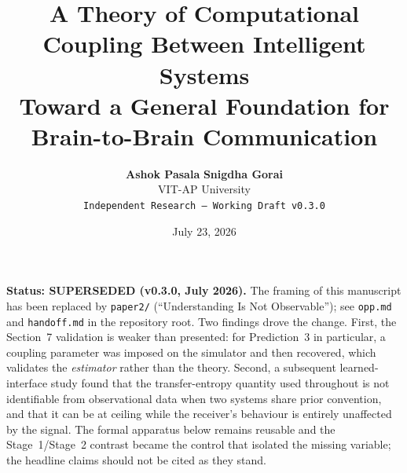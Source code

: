 \documentclass[11pt]{article}
\title{\Large \textbf{A Theory of Computational Coupling Between Intelligent Systems}\\[4pt]
\large Toward a General Foundation for Brain-to-Brain Communication}
\author{\textbf{Ashok Pasala} \quad \textbf{Snigdha Gorai} \\[2pt] \small VIT-AP University \\[2pt] \small \texttt{Independent Research --- Working Draft v0.3.0}}
\date{July 23, 2026}
\begin{document}
\maketitle

\begin{center}
\colorbox{red!15}{\parbox{0.9\textwidth}{\small \textbf{Status: SUPERSEDED (v0.3.0, July 2026).} The framing of this manuscript has been replaced by \texttt{paper2/} (``Understanding Is Not Observable''); see \texttt{opp.md} and \texttt{handoff.md} in the repository root. Two findings drove the change. First, the Section~7 validation is weaker than presented: for Prediction~3 in particular, a coupling parameter was imposed on the simulator and then recovered, which validates the \emph{estimator} rather than the theory. Second, a subsequent learned-interface study found that the transfer-entropy quantity used throughout is not identifiable from observational data when two systems share prior convention, and that it can be at ceiling while the receiver's behaviour is entirely unaffected by the signal. The formal apparatus below remains reusable and the Stage~1/Stage~2 contrast became the control that isolated the missing variable; the headline claims should not be cited as they stand.}}
\end{center}

\vspace{8pt}
\end{document}
